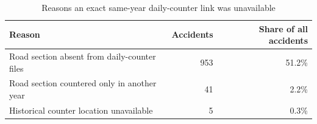 \begin{table}[H]
\centering
\small
\caption{Reasons an exact same-year daily-counter link was unavailable}

\begin{tabularx}{0.9\textwidth}{Xrr}
\toprule
Reason & Accidents & Share of all accidents \\
\midrule
Road section absent from daily-counter files & 953 & 51.2\% \\ \grayhline
Road section countered only in another year & 41 & 2.2\% \\ \grayhline
Historical counter location unavailable & 5 & 0.3\% \\
\bottomrule
\end{tabularx}
\end{table}
